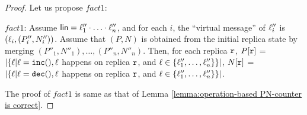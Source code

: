 \begin {proof}
Let us propose $fact1$:

$fact1$: Assume $\alinord = \alabel''_1 \cdot \ldots \cdot \alabel''_n$, and for each $i$, the ``virtual message'' of $\alabel''_i$ is $(\alabel_i,(P''_i,N''_i))$. Assume that $(P,N)$ is obtained from the initial replica state by merging $(P''_1,N''_1),\ldots,(P''_n,N''_n)$. Then, for each replica $\arep$, $P[\arep]$ =  $\vert \{ \alabel \vert \alabel = \alabelshort[{\tt inc}]{}, \alabel$ happens on replica $\arep$, and $\alabel \in \{ \alabel''_1,\ldots,\alabel''_n \} \} \vert$, $N[\arep]$ =  $\vert \{ \alabel \vert \alabel = \alabelshort[{\tt dec}]{}, \alabel$ happens on replica $\arep$, and $\alabel \in \{ \alabel''_1,\ldots,\alabel''_n \} \} \vert$. 

The proof of $fact1$ is same as that of Lemma \ref{lemma:operation-based PN-counter is correct}. 









\end{proof}
